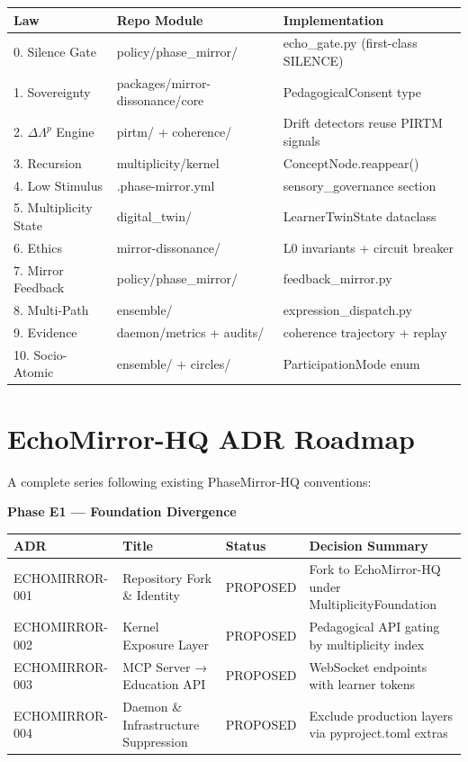 \documentclass[11pt,letterpaper]{article}
\begin{document}
\begin{longtable}{l l l}
\toprule
Law & Repo Module & Implementation \\
\midrule
0. Silence Gate & policy/phase\_mirror/ & echo\_gate.py (first-class SILENCE) \\
1. Sovereignty & packages/mirror-dissonance/core & PedagogicalConsent type \\
2. $\Delta\Lambda^p$ Engine & pirtm/ + coherence/ & Drift detectors reuse PIRTM signals \\
3. Recursion & multiplicity/kernel & ConceptNode.reappear() \\
4. Low Stimulus & .phase-mirror.yml & sensory\_governance section \\
5. Multiplicity State & digital\_twin/ & LearnerTwinState dataclass \\
6. Ethics & mirror-dissonance/ & L0 invariants + circuit breaker \\
7. Mirror Feedback & policy/phase\_mirror/ & feedback\_mirror.py \\
8. Multi-Path & ensemble/ & expression\_dispatch.py \\
9. Evidence & daemon/metrics + audits/ & coherence trajectory + replay \\
10. Socio-Atomic & ensemble/ + circles/ & ParticipationMode enum \\
\bottomrule
\end{longtable}

\section{EchoMirror-HQ ADR Roadmap}
A complete series following existing PhaseMirror-HQ conventions:

\textbf{Phase E1 — Foundation Divergence}
\begin{longtable}{l l l p{6cm}}
\toprule
ADR & Title & Status & Decision Summary \\
\midrule
ECHOMIRROR-001 & Repository Fork \& Identity & PROPOSED & Fork to EchoMirror-HQ under MultiplicityFoundation \\
ECHOMIRROR-002 & Kernel Exposure Layer & PROPOSED & Pedagogical API gating by multiplicity index \\
ECHOMIRROR-003 & MCP Server → Education API & PROPOSED & WebSocket endpoints with learner tokens \\
ECHOMIRROR-004 & Daemon \& Infrastructure Suppression & PROPOSED & Exclude production layers via pyproject.toml extras \\
\bottomrule
\end{longtable}
\end{document}
